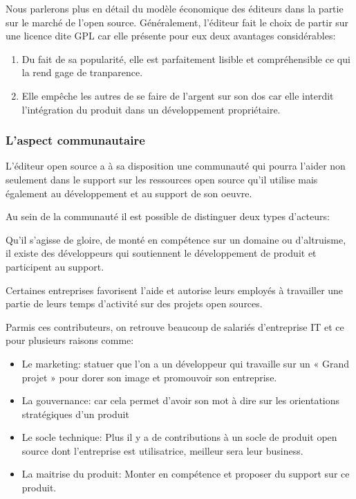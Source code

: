 				Nous parlerons plus en détail du modèle économique des éditeurs dans la partie sur le marché de l'open source.
				Généralement, l'éditeur fait le choix de partir sur une licence dite GPL car elle présente pour eux deux avantages considérables:

				\begin{enumerate}[font=\color{burntorange}]
		 			\item Du fait de sa popularité, elle est parfaitement lisible et compréhensible ce qui la rend gage de tranparence.
		 			\item Elle empêche les autres de se faire de l'argent sur son dos car elle interdit l'intégration du produit dans un développement propriétaire.
				\end{enumerate}

			\subsubsection{L'aspect communautaire}

				L'éditeur open source a à sa disposition une communauté qui pourra l'aider non seulement dans le support sur les ressources open source qu'il utilise mais également au développement et au support de son oeuvre.

				Au sein de la communauté il est possible de distinguer deux types d'acteurs:

				\begin{description}[font=\color{burntorange}]
					\item[les développeurs indépendants: ] Qu'il s'agisse de gloire, de monté en compétence sur un domaine ou d'altruisme, il existe des développeurs qui soutiennent le développement de produit et participent au support.
					\item[Les contributeurs et entreprises contributrices: ] Certaines entreprises favorisent l'aide et autorise leurs employés à travailler une partie de leurs temps d'activité sur des projets open sources.
				\end{description}

				Parmis ces contributeurs, on retrouve beaucoup de salariés d'entreprise IT et ce pour plusieurs raisons comme:

				\begin{itemize}[label=\textbullet, font=\LARGE \color{burntorange}]
					\item Le marketing: statuer que l'on a un développeur qui travaille sur un « Grand projet » pour dorer son image et promouvoir son entreprise.
					\item La gouvernance: car cela permet d'avoir son mot à dire sur les orientations stratégiques d'un produit
					\item Le socle technique: Plus il y a de contributions à un socle de produit open source dont l'entreprise est utilisatrice, meilleur sera leur business.
					\item La maitrise du produit: Monter en compétence et proposer du support sur ce produit.
				\end{itemize}

